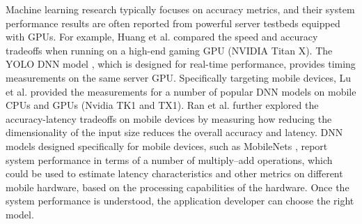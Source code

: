 Machine learning research typically focuses on accuracy metrics, and their system performance results are often reported from powerful server testbeds equipped with GPUs. For example, Huang et al. \cite{huang2016speedaccuracy} compared the speed and accuracy tradeoffs when running on a high-end gaming GPU (NVIDIA Titan X). The YOLO DNN model \cite{YOLO9000}, which is designed for real-time performance, provides timing measurements on the same server GPU.
Specifically targeting mobile devices, Lu et al. \cite{CNN-mobile} provided the measurements for a number of popular DNN models on mobile CPUs and GPUs (Nvidia TK1 and TX1). Ran et al.\cite{Ran-DNN-edge-video-analisys} further explored the accuracy-latency tradeoffs on mobile devices by measuring how reducing the dimensionality of the input size reduces the overall accuracy and latency. DNN models designed specifically for mobile devices, such as MobileNets \cite{howard2017mobilenets}, report system performance in terms of a number of multiply–add operations, which could be used to estimate latency characteristics and other metrics on different mobile hardware, based on the processing capabilities of the hardware.
Once the system performance is understood, the application developer can choose the right model. 



